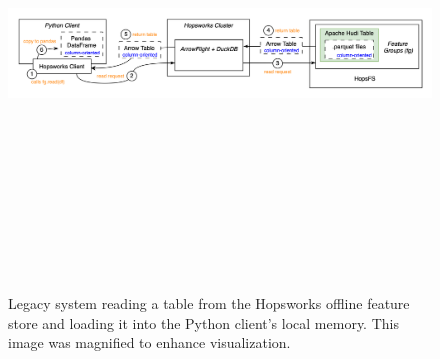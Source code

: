 \begin{figure}
    \begin{center}
      \includegraphics[angle=90,origin=c,keepaspectratio,height=12.5cm]{figures/2-background/FeatureStore-reading.png}
    \end{center}
    \caption[Legacy system - Read process - Magnified diagram]{Legacy system reading a table from the Hopsworks offline feature store and loading it into the Python client's local memory. This image was magnified to enhance visualization.}
    \label{fig:appx_featurestore_reading}
\end{figure}